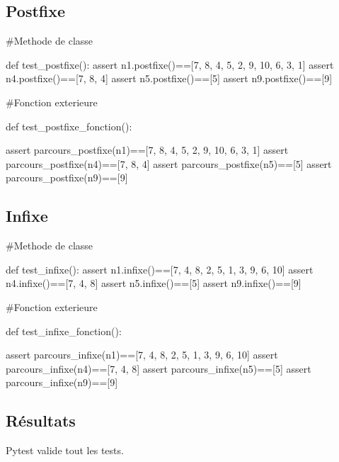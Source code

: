 \documentclass{article}
\begin{document}
\subsection{Postfixe}

\begin{python}
    #Methode de classe

    def test_postfixe():
        assert n1.postfixe()==[7, 8, 4, 5, 2, 9, 10, 6, 3, 1]
        assert n4.postfixe()==[7, 8, 4]
        assert n5.postfixe()==[5]
        assert n9.postfixe()==[9]

    #Fonction exterieure

    def test_postfixe_fonction():
    
        assert parcours_postfixe(n1)==[7, 8, 4, 5, 2, 9, 10, 6, 3, 1]
        assert parcours_postfixe(n4)==[7, 8, 4]
        assert parcours_postfixe(n5)==[5]
        assert parcours_postfixe(n9)==[9]
    


\end{python}

\subsection{Infixe}

\begin{python}
    #Methode de classe

    def test_infixe():
        assert n1.infixe()==[7, 4, 8, 2, 5, 1, 3, 9, 6, 10]
        assert n4.infixe()==[7, 4, 8]
        assert n5.infixe()==[5]
        assert n9.infixe()==[9]

    #Fonction exterieure

    def test_infixe_fonction():
    
        assert parcours_infixe(n1)==[7, 4, 8, 2, 5, 1, 3, 9, 6, 10]
        assert parcours_infixe(n4)==[7, 4, 8]
        assert parcours_infixe(n5)==[5]
        assert parcours_infixe(n9)==[9]
\end{python}
\subsection{Résultats}
Pytest valide tout les tests.
\end{document}
